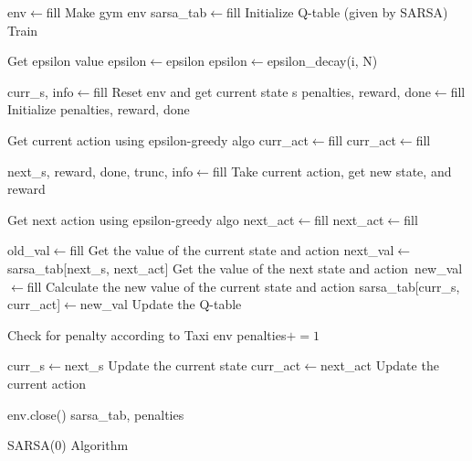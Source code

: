 \begin{algorithm}[H]
\begin{algorithmic}[1]
        \State env$\gets$fill \Comment Make gym env
        \State sarsa\_tab$\gets$fill  \Comment Initialize Q-table (given by SARSA)
         \Comment Train

              \Comment Get epsilon value
                \State epsilon$\gets$epsilon
            \Else
                \State epsilon$\gets$epsilon\_decay(i, N)
            \EndIf

            \State curr\_s, info$\gets$fill \Comment Reset env and get current state s
            \State penalties, reward, done$\gets$fill  \Comment Initialize penalties, reward, done

             \Comment Get current action using epsilon-greedy algo
                \State curr\_act$\gets$fill
            \Else
                \State curr\_act$\gets$fill
            \EndIf

                \State next\_s, reward, done, trunc, info$\gets$fill \Comment Take current action, get new state, and reward

                 \Comment Get next action using epsilon-greedy algo
                    \State next\_act$\gets$fill
                \Else
                    \State next\_act$\gets$fill
                \EndIf

                \State old\_val$\gets$fill \Comment Get the value of the current state and action
                \State next\_val$\gets$sarsa\_tab[next\_s, next\_act] \Comment Get the value of the next state and action\
                \State new\_val$\gets$fill \Comment Calculate the new value of the current state and action
                \State sarsa\_tab[curr\_s, curr\_act]$\gets$new\_val \Comment Update the Q-table

                 \Comment Check for penalty according to Taxi env
                    \State penalties$+=1$
                \EndIf

                \State curr\_s$\gets$next\_s \Comment Update the current state
                \State curr\_act$\gets$next\_act \Comment Update the current action

            \EndWhile

        \EndFor
        \State env.close()
        \State \Return sarsa\_tab, penalties

    \EndProcedure

\end{algorithmic}
\caption{SARSA(0) Algorithm}
\label{alg:sarsa0}
\end{algorithm}

